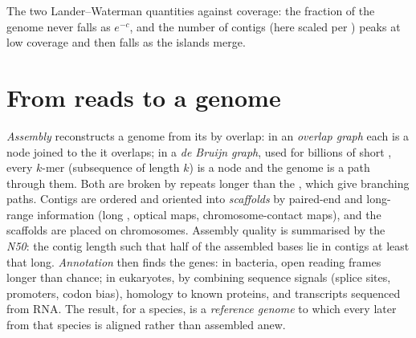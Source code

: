 \begin{omfigure}

{\small The two Lander--Waterman quantities against coverage: the
fraction of the genome never  falls as $e^{-c}$, and the number of
contigs (here scaled per ) peaks at low coverage and then falls as
the islands merge.}
\end{omfigure}

\section{From reads to a genome}

\begin{definition}\label{def:b3:genomics:assembly}
\emph{Assembly} reconstructs a genome from its  by overlap: in an
\emph{overlap graph} each  is a node joined to the  it
overlaps; in a \emph{de Bruijn graph}, used for billions of short
, every $k$-mer (subsequence of length $k$) is a node and the
genome is a path through them. Both are broken by repeats longer than
the , which give branching paths. Contigs are ordered and oriented
into \emph{scaffolds} by paired-end  and long-range information
(long , optical maps, chromosome-contact maps), and the
scaffolds are placed on chromosomes. Assembly quality is summarised by
the \emph{N50}: the contig length such that half of the assembled
bases lie in contigs at least that long. \emph{Annotation} then finds
the genes: in bacteria, open reading frames longer than chance; in
eukaryotes, by combining sequence signals (splice sites, promoters,
codon bias), homology to known proteins, and transcripts sequenced
from RNA. The result, for a species, is a \emph{reference genome} to
which every later  from that species is aligned rather than
assembled anew.
\end{definition}

